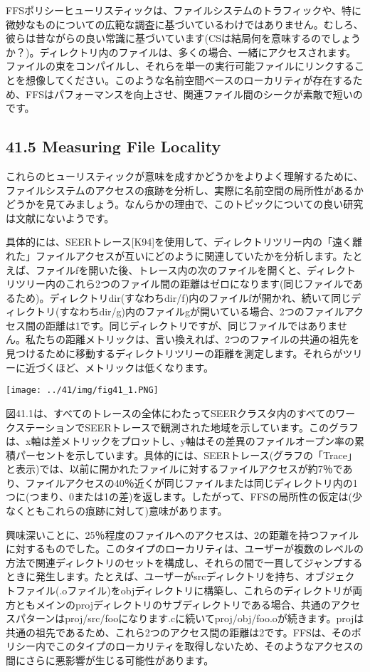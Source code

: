 FFSポリシーヒューリスティックは、ファイルシステムのトラフィックや、特に微妙なものについての広範な調査に基づいているわけではありません。むしろ、彼らは昔ながらの良い常識に基づいています(CSは結局何を意味するのでしょうか？)。ディレクトリ内のファイルは、多くの場合、一緒にアクセスされます。ファイルの束をコンパイルし、それらを単一の実行可能ファイルにリンクすることを想像してください。このような名前空間ベースのローカリティが存在するため、FFSはパフォーマンスを向上させ、関連ファイル間のシークが素敵で短いのです。

\hypertarget{measuring-file-locality}{%
\subsection*{41.5 Measuring File
Locality}\label{measuring-file-locality}}

これらのヒューリスティックが意味を成すかどうかをよりよく理解するために、ファイルシステムのアクセスの痕跡を分析し、実際に名前空間の局所性があるかどうかを見てみましょう。なんらかの理由で、このトピックについての良い研究は文献にないようです。

具体的には、SEERトレース{[}K94{]}を使用して、ディレクトリツリー内の「遠く離れた」ファイルアクセスが互いにどのように関連していたかを分析します。たとえば、ファイルfを開いた後、トレース内の次のファイルを開くと、ディレクトリツリー内のこれら2つのファイル間の距離はゼロになります(同じファイルであるため)。ディレクトリdir(すなわちdir/f)内のファイルfが開かれ、続いて同じディレクトリ(すなわちdir/g)内のファイルgが開いている場合、2つのファイルアクセス間の距離は1です。同じディレクトリですが、同じファイルではありません。私たちの距離メトリックは、言い換えれば、2つのファイルの共通の祖先を見つけるために移動するディレクトリツリーの距離を測定します。それらがツリーに近づくほど、メトリックは低くなります。

\texttt{[image: ../41/img/fig41\_1.PNG]}

図41.1は、すべてのトレースの全体にわたってSEERクラスタ内のすべてのワークステーションでSEERトレースで観測された地域を示しています。このグラフは、x軸は差メトリックをプロットし、y軸はその差異のファイルオープン率の累積パーセントを示しています。具体的には、SEERトレース(グラフの「Trace」と表示)では、以前に開かれたファイルに対するファイルアクセスが約7％であり、ファイルアクセスの40％近くが同じファイルまたは同じディレクトリ内の1つに(つまり、0または1の差)を返します。したがって、FFSの局所性の仮定は(少なくともこれらの痕跡に対して)意味があります。

興味深いことに、25％程度のファイルへのアクセスは、2の距離を持つファイルに対するものでした。このタイプのローカリティは、ユーザーが複数のレベルの方法で関連ディレクトリのセットを構成し、それらの間で一貫してジャンプするときに発生します。たとえば、ユーザーがsrcディレクトリを持ち、オブジェクトファイル(.oファイル)をobjディレクトリに構築し、これらのディレクトリが両方ともメインのprojディレクトリのサブディレクトリである場合、共通のアクセスパターンはproj/src/fooになります.cに続いてproj/obj/foo.oが続きます。projは共通の祖先であるため、これら2つのアクセス間の距離は2です。FFSは、そのポリシー内でこのタイプのローカリティを取得しないため、そのようなアクセスの間にさらに悪影響が生じる可能性があります。

